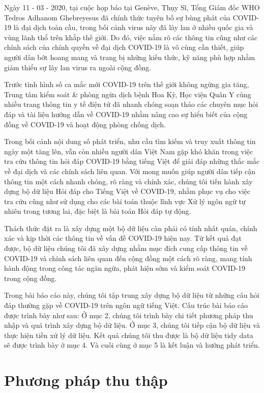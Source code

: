 \documentclass[runningheads]{llncs}
\begin{document}
Ngày 11 - 03 - 2020, tại cuộc họp báo tại Genève, Thụy Sĩ, Tổng Giám đốc WHO Tedros Adhanom Ghebreyesus đã chính thức tuyên bố sự bùng phát của COVID-19 là đại dịch toàn cầu, trong bối cảnh virus này đã lây lan ở nhiều quốc gia và vùng lãnh thổ trên khắp thế giới. Do đó, việc nắm rõ các thông tin cũng như các chính sách của chính quyền về đại dịch COVID-19 là vô cùng cần thiết, giúp người dân bớt hoang mang và trang bị những kiến thức, kỹ năng phù hợp nhằm giảm thiểu sự lây lan virus ra ngoài cộng đồng.

Trước tình hình số ca mắc mới COVID-19 trên thế giới không ngừng gia tăng, Trung tâm kiểm soát \& phòng ngừa dịch bệnh Hoa Kỳ, Học viện Quân Y cùng nhiều trang thông tin y tế điện tử đã nhanh chóng soạn thảo các chuyên mục hỏi đáp và tài liệu hướng dẫn về COVID-19 nhằm nâng cao sự hiểu biết của cộng đồng về COVID-19 và hoạt động phòng chống dịch. 

Trong bối cảnh nội dung số phát triển, nhu cầu tìm kiếm và truy xuất thông tin ngày một tăng lên, vẫn còn nhiều người dân Việt Nam gặp khó khăn trong việc tra cứu thông tin hỏi đáp COVID-19 bằng tiếng Việt để giải đáp những thắc mắc về đại dịch và các chính sách liên quan.
Với mong muốn giúp người dân tiếp cận thông tin một cách nhanh chóng, rõ ràng và chính xác, chúng tôi tiến hành xây dựng bộ dữ liệu Hỏi đáp cho Tiếng Việt về COVID-19, nhằm phục vụ cho việc tra cứu cũng như sử dụng cho các bài toán thuộc lĩnh vực Xử lý ngôn ngữ tự nhiên trong tương lai, đặc biệt là bài toán Hỏi đáp tự động.

Thách thức đặt ra là xây dựng một bộ dữ liệu càn phải có tính nhất quán, chính xác và kịp thời các thông tin về vấn đề COVID-19 hiện nay. Từ kết quả đạt được, bộ dữ liệu chúng tôi đã xây dựng nhằm mục đích cung cấp thông tin về COVID-19 và chính sách liên quan đến cộng đồng một cách rõ ràng, mang tính hành động trong công tác ngăn ngừa, phát hiện sớm và kiểm soát COVID-19 trong cộng đồng.

Trong bài báo cáo này, chúng tôi tập trung xây dựng bộ dữ liệu từ những câu hỏi đáp thường gặp về COVID-19 trên ngôn ngữ tiếng Việt. Cấu trúc bài báo cáo được trình bày như sau: Ở mục 2, chúng tôi trình bày chi tiết phương pháp thu nhập và quá trình xây dựng bộ dữ liệu. Ở mục 3, chúng tôi tiếp cận bộ dữ liệu và thực hiện tiền xử lý dữ liệu. Kết quả chúng tôi thu được là bộ dữ liệu tidy data sẽ được trình bày ở mục 4. Và cuối cùng ở mục 5 là kết luận và hướng phát triển.

\section{Phương pháp thu thập}
\end{document}
